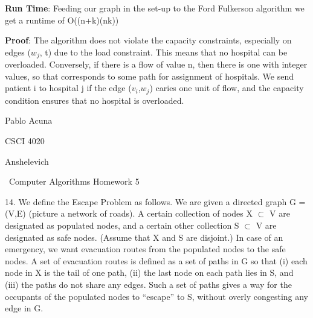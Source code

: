 \documentclass{article}
\begin{document}
\textbf{Run Time}:  Feeding our graph in the set-up to the Ford Fulkerson algorithm we get a runtime of
O((n+k)(nk)) \newline

\textbf{Proof}: The algorithm does not violate the capacity constraints, especially on edges ($w_j$, t)
due to the load constraint. This means that no hospital can be overloaded.
Conversely, if there is a flow of value n, then there is one with integer values,
so that corresponds to some path for assignment of hospitals.
We send patient i to hospital j if the edge ($v_i$,$w_j$) caries one
unit of flow, and the capacity condition ensures that no hospital
is overloaded.

\clearpage

Pablo Acuna

CSCI 4020

Anshelevich

{\centering\ Computer Algorithms Homework 5 \par}

14. We define the Escape Problem as follows. We are given a directed graph
G = (V,E) (picture a network of roads). A certain collection of nodes X $\subset$ V
are designated as populated nodes, and a certain other collection S $\subset$ V are
designated as safe nodes. (Assume that X and S are disjoint.) In case of an
emergency, we want evacuation routes from the populated nodes to the safe nodes.
 A set of evacuation routes is defined as a set of paths in G so that (i) each node in
X is the tail of one path, (ii) the last node on each path lies in S, and (iii)
the paths do not share any edges. Such a set of paths gives a way for the occupants
of the populated nodes to “escape” to S, without overly congesting any edge in G. \newline
\end{document}
